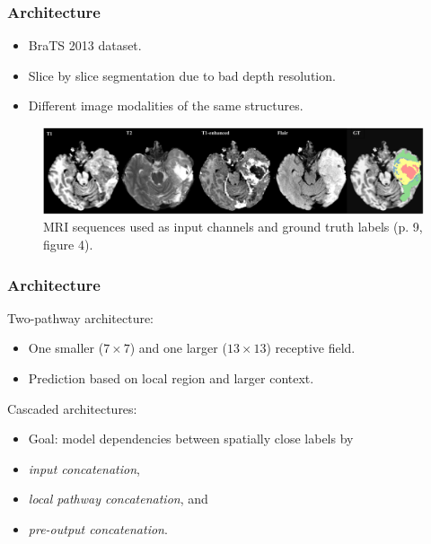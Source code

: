 \documentclass[aspectratio=43, notes]{beamer} 	%
\begin{document}
\begin{frame}
	\frametitle<presentation>{Architecture}
	\begin{itemize}
		\item BraTS 2013 dataset.
		\item Slice by slice segmentation due to bad depth resolution.
		\item Different image modalities of the same structures.
	\end{itemize}
	\begin{figure}[!t]
		\centering
			\includegraphics[width=\textwidth]{bilder/mri_sequences.png}
		\caption{MRI sequences used as input channels and ground truth labels (p. 9, figure 4).}
		\label{fig:mri_sequences}
	\end{figure}
\end{frame}

\begin{frame}
	\frametitle<presentation>{Architecture}
	\begin{block}{Two-pathway architecture:}
		\begin{itemize}
			\item One smaller ($7 \times 7$) and one larger ($13 \times 13$) receptive field.
			\item Prediction based on local region and larger context.
		\end{itemize}
	\end{block}
	\begin{block}{Cascaded architectures:}
		\begin{itemize}
			\item Goal: model dependencies between spatially close labels by
			\item \emph{input concatenation},
			\item \emph{local pathway concatenation}, and
			\item \emph{pre-output concatenation}.
		\end{itemize} 	
 	\end{block}
\end{frame}
\end{document}
